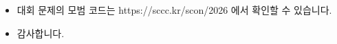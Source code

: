     
    \begin{frame} %
        \begin{itemize}
            \item 대회 문제의 모범 코드는 https://sccc.kr/scon/2026 에서 확인할 수 있습니다.
            \item 감사합니다.
        \end{itemize}
    \end{frame}

